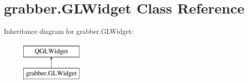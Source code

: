 \hypertarget{classgrabber_1_1GLWidget}{}\section{grabber.\+G\+L\+Widget Class Reference}
\label{classgrabber_1_1GLWidget}
Inheritance diagram for grabber.\+G\+L\+Widget\+:\begin{figure}[H]
\begin{center}
\leavevmode
\includegraphics[height=2.000000cm]{classgrabber_1_1GLWidget}
\end{center}
\end{figure}
